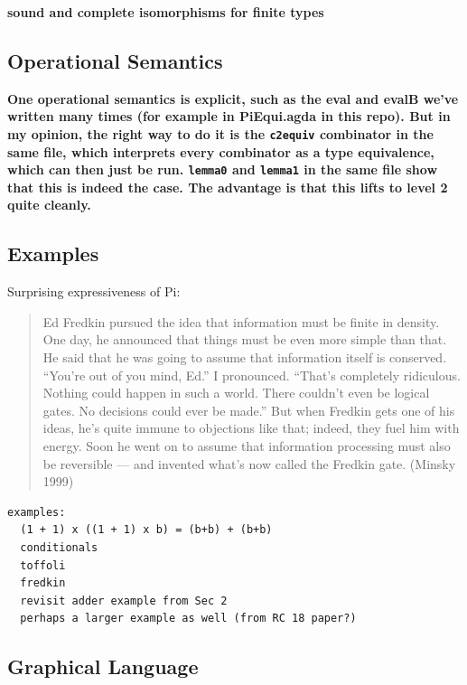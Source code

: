 \documentclass{article}
\newcommand{\amr}[1]{\fbox{Amr says:} \textbf{#1}}
\newcommand{\jc}[1]{\fbox{Jacques says:} \textbf{#1}}
\begin{document}
\amr{sound and complete isomorphisms for finite types}

\subsection{Operational Semantics}

\jc{One operational semantics is explicit, such as the eval and
evalB we've written many times (for example in PiEqui.agda in
this repo). But in my opinion, the right way to do it is the
\texttt{c2equiv} combinator in the same file, which interprets
every combinator as a type equivalence, which can then just be
run. \texttt{lemma0} and \texttt{lemma1} in the same file show
that this is indeed the case. The advantage is that this lifts
to level 2 quite cleanly.}

\subsection{Examples}

Surprising expressiveness of Pi:

\begin{quote}
  Ed Fredkin pursued the idea that information must be finite in
  density. One day, he announced that things must be even more simple
  than that. He said that he was going to assume that information
  itself is conserved. “You’re out of you mind, Ed.” I
  pronounced. “That’s completely ridiculous. Nothing could happen in
  such a world. There couldn’t even be logical gates. No decisions
  could ever be made.” But when Fredkin gets one of his ideas, he’s
  quite immune to objections like that; indeed, they fuel him with
  energy. Soon he went on to assume that information processing must
  also be reversible — and invented what’s now called the Fredkin
  gate. (Minsky 1999)
\end{quote}

\begin{verbatim}
examples:
  (1 + 1) x ((1 + 1) x b) = (b+b) + (b+b)
  conditionals
  toffoli
  fredkin
  revisit adder example from Sec 2
  perhaps a larger example as well (from RC 18 paper?)
\end{verbatim}

\subsection{Graphical Language}

\end{document}
